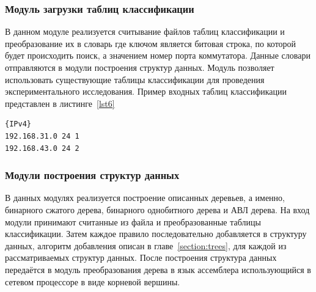 \documentclass[conference]{IEEEtran}
\begin{document}
        \subsubsection{Модуль загрузки таблиц классификации}
            \label{section:tablemod}
            В данном модуле реализуется считывание файлов таблиц классификации и преобразование их в словарь где ключом является битовая строка,
            по которой будет происходить поиск, а значением номер порта коммутатора. Данные словари отправляются в модули построения структур данных.
            Модуль позволяет использовать существующие таблицы классификации для проведения экспериментального исследования.
            Пример входных таблиц классификации представлен в листинге~\ref{lst6}\\
\begin{lstlisting}[caption=Пример таблиц классификации, label=lst6]
{IPv4}
192.168.31.0 24 1
192.168.43.0 24 2
\end{lstlisting}
        \subsubsection{Модули построения структур данных}
            В данных модулях реализуется построение описанных деревьев, а именно, бинарного сжатого дерева, бинарного однобитного дерева и АВЛ дерева.
            На вход модули принимают считанные из файла и преобразованные таблицы классификации.
            Затем каждое правило последовательно добавляется в структуру данных, алгоритм добавления описан в главе~\ref{section:trees}, для каждой из 
            рассматриваемых структур данных.
            После построения структура данных передаётся в модуль преобразования дерева в язык ассемблера использующийся в сетевом процессоре в виде корневой вершины.
            
\end{document}
